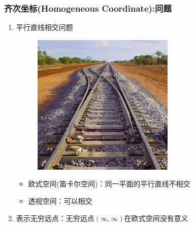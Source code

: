 \documentclass[aspectratio=43]{beamer}
\begin{document}
	\begin{frame}
	\frametitle{齐次坐标(Homogeneous Coordinate):问题}
	\begin{enumerate}
		\item 平行直线相交问题
		\begin{figure}
			\begin{center}
				\includegraphics[scale=0.4]{平行线相交}
			\end{center}
		\end{figure}
		\begin{itemize}
		\item 欧式空间(笛卡尔空间)：同一平面的平行直线不相交
		\item 透视空间：可以相交
		\end{itemize}
		\item 表示无穷远点：无穷远点$\left( \infty ,\infty \right)$在欧式空间没有意义
	\end{enumerate}
	\end{frame}
\end{document}
